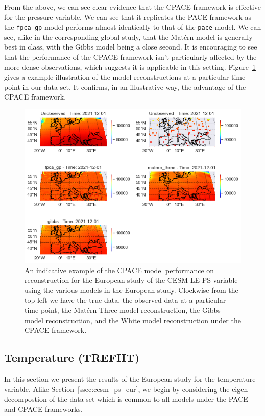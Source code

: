 From the above, we can see clear evidence that the CPACE framework is effective for the pressure variable.
We can see that it replicates the PACE framework as the \verb*|fpca_gp| model performs almost identically to that of the \verb*|pace| model.
We can see, alike in the corresponding global study, that the Mat\'ern model is generally best in class, with the Gibbs model being a close second.
It is encouraging to see that the performance of the CPACE framework isn't particularly affected by the more dense observations, which suggests it is applicable in this setting. 
Figure~\ref{fig:full_ex_ps_eur} gives a example illustration of the model reconstructions at a particular time point in our data set.
It confirms,  in an illustrative way, the advantage of the CPACE framework.

\begin{figure}
	\centering
	\includegraphics[width=\textwidth]{full_ex_ps_eur}
	\caption{An indicative example of the CPACE model performance on reconstruction for the European study of the CESM-LE PS variable using the various models in the European study. Clockwise from the top left we have the true data, the observed data at a particular time point, the Mat\'ern Three model reconstruction, the Gibbs model reconstruction, and the White model reconstruction under the CPACE framework.}
	\label{fig:full_ex_ps_eur}
\end{figure}

\subsection{Temperature (TREFHT) \label{ssec:cesm_trefht_eur}}
In this section we present the results of the European study for the temperature variable. 
Alike Section~\ref{ssec:cesm_ps_eur}, we begin by considering the eigen decompostion of the data set which is common to all models under the PACE and CPACE frameworks. 

